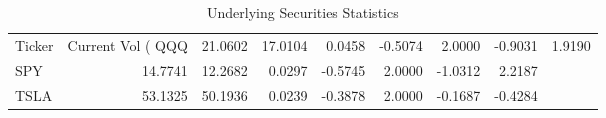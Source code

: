 \begin{table}
\caption{Underlying Securities Statistics}
\label{tab:statistics}
\begin{tabular}{lrrrrrrr}
\toprule
Ticker & Current Vol (%
\midrule
QQQ & 21.0602 & 17.0104 & 0.0458 & -0.5074 & 2.0000 & -0.9031 & 1.9190 \\
SPY & 14.7741 & 12.2682 & 0.0297 & -0.5745 & 2.0000 & -1.0312 & 2.2187 \\
TSLA & 53.1325 & 50.1936 & 0.0239 & -0.3878 & 2.0000 & -0.1687 & -0.4284 \\
\bottomrule
\end{tabular}
\end{table}
